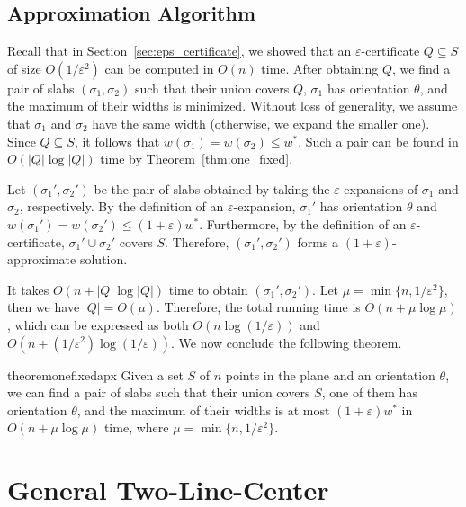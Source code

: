 \documentclass[english,a4paper, cleveref, autoref, thm-restate, nolineno]{socg-lipics-v2021}
\theoremstyle{star}
\theoremstyle{claimstar}
\newcommand{\eps}{\ensuremath{\varepsilon}}
\begin{document}
\subsection{Approximation Algorithm}
\label{sec:one_fixed_approximation}

Recall that in Section~\ref{sec:eps_certificate}, we showed that an $\eps$-certificate $Q \subseteq S$ of size $O(1/\eps^2)$ can be computed in $O(n)$ time. 
After obtaining $Q$, we find a pair of slabs $(\sigma_1, \sigma_2)$ such that their union covers $Q$, $\sigma_1$ has orientation $\theta$, and the maximum of their widths is minimized.
Without loss of generality, we assume that $\sigma_1$ and $\sigma_2$ have the same width (otherwise, we expand the smaller one).
Since $Q \subseteq S$, it follows that $w(\sigma_1) = w(\sigma_2) \le w^*$. 
Such a pair can be found in $O(|Q|\log |Q|)$ time by Theorem~\ref{thm:one_fixed}. 

Let $(\sigma_1', \sigma_2')$ be the pair of slabs obtained by taking the $\eps$-expansions of $\sigma_1$ and $\sigma_2$, respectively. 
By the definition of an $\eps$-expansion, $\sigma_1'$ has orientation $\theta$ and $w(\sigma_1')= w(\sigma_2') \le (1+\eps)w^*$. 
Furthermore, by the definition of an $\eps$-certificate, $\sigma_1' \cup \sigma_2'$ covers $S$. 
Therefore, $(\sigma_1', \sigma_2')$ forms a $(1+\eps)$-approximate solution. 

It takes $O(n + |Q|\log |Q|)$ time to obtain $(\sigma_1', \sigma_2')$. 
Let $\mu = \min \{n, 1/\eps^2\}$, then we have $|Q| = O(\mu)$. 
Therefore, the total running time is $O(n + \mu \log \mu)$, which can be expressed as both $O(n \log (1/\eps))$ and $O(n + (1/\eps^2) \log (1/\eps))$. 
We now conclude the following theorem.




\begin{restatable}{theorem}{onefixedapx}
    \label{thm:one_fixed_apx}
    Given a set $S$ of $n$ points in the plane and an orientation $\theta$, we can find a pair of slabs such that their union covers $S$, one of them has orientation $\theta$, and the maximum of their widths is at most $(1+\eps)w^*$ in $O(n+ \mu\log \mu)$ time, where $\mu = \min \{n, 1/\eps^2\}$.  
\end{restatable}



\section{General Two-Line-Center}
\label{sec:general}
\end{document}

